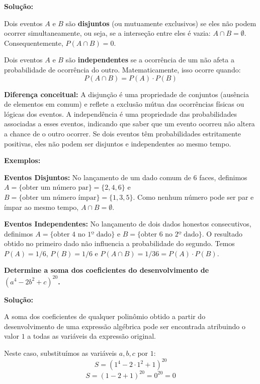 \documentclass[a4paper,10pt,landscape,twocolumn]{article}  %
\let\oldenumerate\enumerate
\let\oldendenumerate\endenumerate
\renewenvironment{enumerate}{%
  \oldenumerate%
  \setlength{\itemsep}{1pt}%
  \setlength{\parskip}{0pt}%
  \setlength{\parsep}{0pt}%
  \setlength{\topsep}{2pt}%
  \setlength{\partopsep}{0pt}%
}{%
  \oldendenumerate%
}
\let\olditemize\itemize
\let\oldenditemize\enditemize
\renewenvironment{itemize}{%
  \olditemize%
  \setlength{\itemsep}{1pt}%
  \setlength{\parskip}{0pt}%
  \setlength{\parsep}{0pt}%
  \setlength{\topsep}{2pt}%
  \setlength{\partopsep}{0pt}%
}{%
  \oldenditemize%
}
\begin{document}
\begin{enumerate}
    \textbf{Solução:}
    
    Dois eventos $A$ e $B$ são \textbf{disjuntos} (ou mutuamente exclusivos) se eles não podem ocorrer simultaneamente, ou seja, se a interseção entre eles é vazia: $A \cap B = \emptyset$. Consequentemente, $P(A \cap B) = 0$.
    
    Dois eventos $A$ e $B$ são \textbf{independentes} se a ocorrência de um não afeta a probabilidade de ocorrência do outro. Matematicamente, isso ocorre quando:
    \[ P(A \cap B) = P(A) \cdot P(B) \]
    
    \textbf{Diferença conceitual:} A disjunção é uma propriedade de conjuntos (ausência de elementos em comum) e reflete a exclusão mútua das ocorrências físicas ou lógicas dos eventos. A independência é uma propriedade das probabilidades associadas a esses eventos, indicando que saber que um evento ocorreu não altera a chance de o outro ocorrer. Se dois eventos têm probabilidades estritamente positivas, eles não podem ser disjuntos e independentes ao mesmo tempo.
    
    \textbf{Exemplos:}
    \begin{itemize}
        \item \textbf{Eventos Disjuntos:} No lançamento de um dado comum de 6 faces, definimos $A = \{\text{obter um número par}\} = \{2, 4, 6\}$ e $B = \{\text{obter um número ímpar}\} = \{1, 3, 5\}$. Como nenhum número pode ser par e ímpar ao mesmo tempo, $A \cap B = \emptyset$.
        \item \textbf{Eventos Independentes:} No lançamento de dois dados honestos consecutivos, definimos $A = \{\text{obter 4 no 1º dado}\}$ e $B = \{\text{obter 6 no 2º dado}\}$. O resultado obtido no primeiro dado não influencia a probabilidade do segundo. Temos $P(A) = 1/6$, $P(B) = 1/6$ e $P(A \cap B) = 1/36 = P(A) \cdot P(B)$.
    \end{itemize}
    
    \item \textbf{Determine a soma dos coeficientes do desenvolvimento de $(a^4 - 2b^2 + c)^{20}$.}
    
    \textbf{Solução:}
    
    A soma dos coeficientes de qualquer polinômio obtido a partir do desenvolvimento de uma expressão algébrica pode ser encontrada atribuindo o valor $1$ a todas as variáveis da expressão original. 
    
    Neste caso, substituímos as variáveis $a, b, c$ por $1$:
    \[ S = (1^4 - 2 \cdot 1^2 + 1)^{20} \]
    \[ S = (1 - 2 + 1)^{20} = 0^{20} = 0 \]
    

\end{enumerate}
\end{document}
